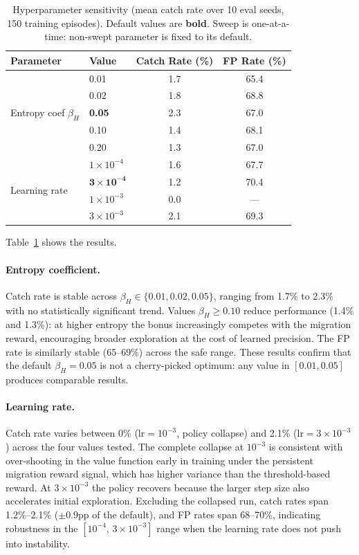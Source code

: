 \documentclass[review,1p]{elsarticle}
\theoremstyle{definition}
\begin{document}
\begin{table}[t]
\centering
\small
\caption{Hyperparameter sensitivity (mean catch rate over 10 eval seeds,
150 training episodes). Default values are \textbf{bold}.
Sweep is one-at-a-time: non-swept parameter is fixed to its default.}
\label{tab:sensitivity}
\begin{tabular}{llcc}
\toprule
Parameter & Value & Catch Rate (\%) & FP Rate (\%) \\
\midrule
\multirow{5}{*}{Entropy coef $\beta_H$}
  & 0.01  & 1.7 & 65.4 \\
  & 0.02  & 1.8 & 68.8 \\
  & \textbf{0.05}  & 2.3 & 67.0 \\
  & 0.10  & 1.4 & 68.1 \\
  & 0.20  & 1.3 & 67.0 \\
\midrule
\multirow{4}{*}{Learning rate}
  & $1\times10^{-4}$ & 1.6 & 67.7 \\
  & $\mathbf{3\times10^{-4}}$ & 1.2 & 70.4 \\
  & $1\times10^{-3}$ & 0.0 & --- \\
  & $3\times10^{-3}$ & 2.1 & 69.3 \\
\bottomrule
\end{tabular}
\end{table}

Table~\ref{tab:sensitivity} shows the results.

\paragraph{Entropy coefficient.}
Catch rate is stable across $\beta_H \in \{0.01, 0.02, 0.05\}$,
ranging from 1.7\% to 2.3\% with no statistically significant trend.
Values $\beta_H \geq 0.10$ reduce performance (1.4\% and 1.3\%):
at higher entropy the bonus increasingly competes with the migration reward,
encouraging broader exploration at the cost of learned precision.
The FP rate is similarly stable (65--69\%) across the safe range.
These results confirm that the default $\beta_H{=}0.05$ is not a
cherry-picked optimum: any value in $[0.01, 0.05]$ produces comparable results.

\paragraph{Learning rate.}
Catch rate varies between 0\% ($\text{lr}{=}10^{-3}$, policy collapse) and 2.1\%
($\text{lr}{=}3 \times 10^{-3}$) across the four values tested.
The complete collapse at $10^{-3}$ is consistent with over-shooting
in the value function early in training under the persistent migration
reward signal, which has higher variance than the threshold-based reward.
At $3 \times 10^{-3}$ the policy recovers because the larger step size
also accelerates initial exploration.  Excluding the collapsed run,
catch rates span 1.2\%--2.1\% ($\pm 0.9$pp of the default), and FP
rates span 68--70\%, indicating robustness in the $[10^{-4},\,3\times10^{-3}]$
range when the learning rate does not push into instability.
\end{document}

